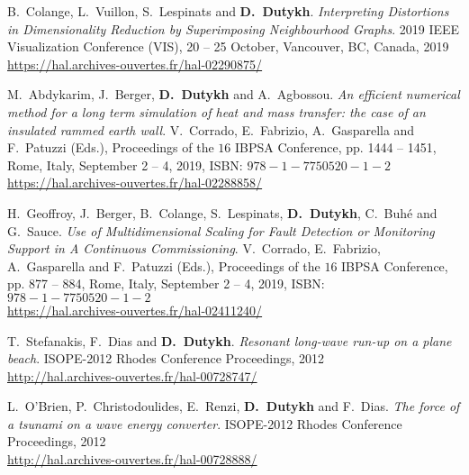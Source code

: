 \documentclass[final, a4paper, oneside, 12pt]{article}
\numberwithin{equation}{section}
\begin{document}
\begin{etaremune}


  \item B.~Colange, L.~Vuillon, S.~Lespinats and \textbf{D.~Dutykh}. \textit{Interpreting Distortions in Dimensionality Reduction by Superimposing Neighbourhood Graphs}. 2019 IEEE Visualization Conference (VIS), 20 -- 25 October, Vancouver, BC, Canada, 2019 \\ %
  \url{https://hal.archives-ouvertes.fr/hal-02290875/}

  \item M.~Abdykarim, J.~Berger, \textbf{D.~Dutykh} and A.~Agbossou. \textit{An efficient numerical method for a long term simulation of heat and mass transfer: the case of an insulated rammed earth wall}. V.~Corrado, E.~Fabrizio, A.~Gasparella and F.~Patuzzi (Eds.), Proceedings of the $16$ IBPSA Conference, pp. 1444 -- 1451, Rome, Italy, September 2 -- 4, 2019, ISBN: $978-1-7750520-1-2$ \\ %
  \url{https://hal.archives-ouvertes.fr/hal-02288858/}

  \item H.~Geoffroy, J.~Berger, B.~Colange, S.~Lespinats, \textbf{D.~Dutykh}, C.~Buh\'e and G.~Sauce. \textit{Use of Multidimensional Scaling for Fault Detection or Monitoring Support in A Continuous Commissioning}. V.~Corrado, E.~Fabrizio, A.~Gasparella and F.~Patuzzi (Eds.), Proceedings of the $16$ IBPSA Conference, pp. 877 -- 884, Rome, Italy, September 2 -- 4, 2019, ISBN: $978-1-7750520-1-2$ \\ %
  \url{https://hal.archives-ouvertes.fr/hal-02411240/}



  \item T.~Stefanakis, F.~Dias and \textbf{D.~Dutykh}. \textit{Resonant long-wave run-up on a plane beach}. ISOPE-2012 Rhodes Conference Proceedings, 2012 \\ %
  \url{http://hal.archives-ouvertes.fr/hal-00728747/}

  \item L.~O'Brien, P.~Christodoulides, E.~Renzi, \textbf{D.~Dutykh} and F.~Dias. \textit{The force of a tsunami on a wave energy converter}. ISOPE-2012 Rhodes Conference Proceedings, 2012 \\ %
  \url{http://hal.archives-ouvertes.fr/hal-00728888/}
  

\end{etaremune}
\end{document}
